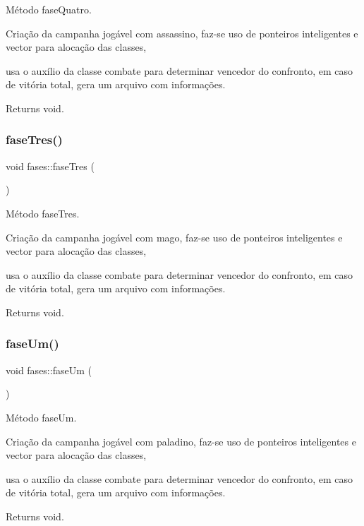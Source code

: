 Método fase\+Quatro. 

Criação da campanha jogável com assassino, faz-\/se uso de ponteiros inteligentes e vector para alocação das classes,

usa o auxílio da classe combate para determinar vencedor do confronto, em caso de vitória total, gera um arquivo com informações. \begin{DoxyReturn}{Returns}
void. 
\end{DoxyReturn}
\mbox{\label{classfases_a05138769008d5c7d1b548916ecfa9f34}} 
\subsubsection{\texorpdfstring{fase\+Tres()}{faseTres()}}
{\footnotesize\ttfamily void fases\+::fase\+Tres (\begin{DoxyParamCaption}{ }\end{DoxyParamCaption})}



Método fase\+Tres. 

Criação da campanha jogável com mago, faz-\/se uso de ponteiros inteligentes e vector para alocação das classes,

usa o auxílio da classe combate para determinar vencedor do confronto, em caso de vitória total, gera um arquivo com informações. \begin{DoxyReturn}{Returns}
void. 
\end{DoxyReturn}
\mbox{\label{classfases_a89059232b76460277f9846fc6d66488c}} 
\subsubsection{\texorpdfstring{fase\+Um()}{faseUm()}}
{\footnotesize\ttfamily void fases\+::fase\+Um (\begin{DoxyParamCaption}{ }\end{DoxyParamCaption})}



Método fase\+Um. 

Criação da campanha jogável com paladino, faz-\/se uso de ponteiros inteligentes e vector para alocação das classes,

usa o auxílio da classe combate para determinar vencedor do confronto, em caso de vitória total, gera um arquivo com informações. \begin{DoxyReturn}{Returns}
void. 
\end{DoxyReturn}
\mbox{\label{classfases_aedbb30c3e8ad0b50e96561029aecdf4a}} 
